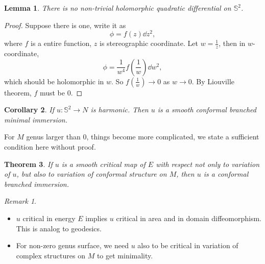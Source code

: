 \documentclass[UTF8,12pt]{article}
\theoremstyle{plain}\newtheorem{theorem}{Theorem}
\theoremstyle{definition}\newtheorem{definition}[theorem]{Definition}
\theoremstyle{definition}\newtheorem{example}[theorem]{Example}
\theoremstyle{plain}\newtheorem{axiom}[theorem]{Axiom}
\theoremstyle{plain}\newtheorem{assertion}[theorem]{Assertion}
\theoremstyle{plain}\newtheorem{corollary}[theorem]{Corollary}
\theoremstyle{plain}\newtheorem{lemma}[theorem]{Lemma}
\theoremstyle{plain}\newtheorem{proposition}[theorem]{Proposition}
\theoremstyle{plain}\newtheorem{prop}[theorem]{Proposition}
\theoremstyle{plain}\newtheorem{conjecture}[theorem]{Conjecture}
\theoremstyle{plain}\newtheorem{conj}[theorem]{Conjecture}
\theoremstyle{plain}\newtheorem{problem}[theorem]{Problem}
\theoremstyle{remark}\newtheorem{notation}[theorem]{Notation}
\theoremstyle{definition}\newtheorem*{question}{Question}
\theoremstyle{definition}\newtheorem*{answer}{Answer}
\theoremstyle{definition}\newtheorem*{goal}{Goal}
\theoremstyle{plain}\newtheorem*{application}{Application}
\theoremstyle{plain}\newtheorem*{exercise}{Exercise}
\theoremstyle{remark}\newtheorem*{remark}{Remark}
\theoremstyle{remark}\newtheorem*{note}{\small{Note}}
\numberwithin{equation}{section}
\numberwithin{theorem}{section}
\numberwithin{figure}{section}
\begin{document}
\begin{lemma}
    There is no non-trivial holomorphic quadratic differential on \(\mathbb{S}^2\).
\end{lemma}
\begin{proof}
    Suppose there is one, write it as \[
        \phi=f(z)\dd{z}^2
    ,\] where \(f\) is a entire function, \(z\) is stereographic coordinate. Let
    \(w=\frac{1}{z}\), then in \(w\)-coordinate, \[
        \phi=\frac{1}{w^4}f(\frac{1}{w})\dd{w}^2
    ,\] which should be holomorphic in \(w\). So \(f(\frac{1}{w})\to 0\) as \(w\to 0\).
    By Liouville theorem, \(f\) must be \(0\).
\end{proof}
\begin{corollary}\label{thm:harmonic-is-conformal}
    If \(u\colon \mathbb{S}^2\to N\) is harmonic. Then \(u\) is a
    smooth conformal branched minimal immersion.
\end{corollary}

For \(M\) genus larger than 0, things become more complicated, we state a sufficient
condition here without proof.
\begin{theorem}
    If \(u\) is a smooth critical map of \(E\) with respect not only to variation of
    \(u\), but also to variation of conformal structure on \(M\), then \(u\) is a
    conformal branched immersion.
\end{theorem}

\begin{remark}\hfill
\begin{itemize}
\item \(u\) critical in energy \(E\) implies \(u\) critical in area and in domain
    diffeomorphism. This is analog to geodesics.
\item For non-zero genus surface, we need \(u\) also to be critical in variation of
    complex structures on \(M\) to get minimality.
\end{itemize}
\end{remark}
\end{document}
